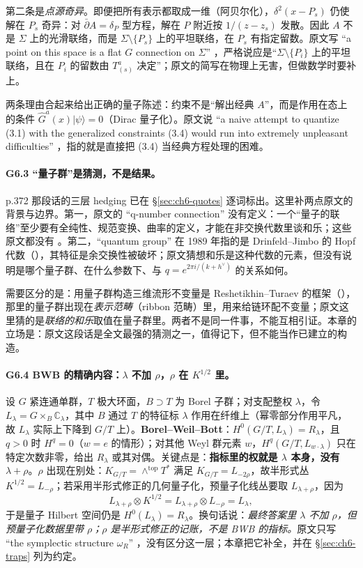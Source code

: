 第二条是\emph{点源奇异}。即便把所有表示都取成一维（阿贝尔化），$\delta^2(x-P_s)$ 仍使解在 $P_s$ 奇异：对 $\bar\partial A=\delta_P$ 型方程，解在 $P$ 附近按 $1/(z-z_s)$ 发散。因此 $A$ 不是 $\Sigma$ 上的光滑联络，而是 $\Sigma\setminus\{P_s\}$ 上的平坦联络，在 $P_s$ 有指定留数。原文写 “a point on this space is a flat $G$ connection on $\Sigma$” ，严格说应是“$\Sigma\setminus\{P_i\}$ 上的平坦联络，且在 $P_i$ 的留数由 $T^a_{(s)}$ 决定”；原文的简写在物理上无害，但做数学时要补上。

两条理由合起来给出正确的量子陈述：约束不是“解出经典 $A$”，而是作用在态上的条件 $\hat G^a(x)|\psi\rangle=0$（Dirac 量子化）。原文说 “a naive attempt to quantize (3.1) with the generalized constraints (3.4) would run into extremely unpleasant difficulties” ，指的就是直接把 (3.4) 当经典方程处理的困难。

\paragraph{G6.3 “量子群”是猜测，不是结果。}p.372 那段话的三层 hedging 已在 \S\ref{sec:ch6-quotes} 逐词标出。这里补两点原文的背景与边界。第一，原文的 “q-number connection” 没有定义：一个“量子的联络”至少要有全纯性、规范变换、曲率的定义，才能在非交换代数里谈和乐；这些原文都没有 。第二，“quantum group” 在 1989 年指的是 Drinfeld--Jimbo 的 Hopf 代数（\cite{drinfeld1986}），其特征是余交换性被破坏；原文猜想和乐是这种代数的元素，但没有说明是哪个量子群、在什么参数下、与 $q=e^{2\pi i/(k+h^\vee)}$ 的关系如何。

需要区分的是：用量子群构造三维流形不变量是 Reshetikhin--Turaev 的框架（\cite{rt1991}），那里的量子群出现在\emph{表示范畴}（ribbon 范畴）里，用来给链环配不变量；原文这里猜的是\emph{联络的和乐}取值在量子群里。两者不是同一件事，不能互相引证。本章的立场是：原文这段话是全文最强的猜测之一，值得记下，但不能当作已建立的构造。

\paragraph{G6.4 BWB 的精确内容：$\lambda$ 不加 $\rho$，$\rho$ 在 $K^{1/2}$ 里。}设 $G$ 紧连通单群，$T$ 极大环面，$B\supset T$ 为 Borel 子群；对支配整权 $\lambda$，令 $L_\lambda=G\times_B\mathbb C_\lambda$，其中 $B$ 通过 $T$ 的特征标 $\lambda$ 作用在纤维上（幂零部分作用平凡，故 $L_\lambda$ 实际上下降到 $G/T$ 上）。\textbf{Borel--Weil--Bott}：$H^0(G/T,L_\lambda)=R_\lambda$，且 $q>0$ 时 $H^q=0$（$w=e$ 的情形）；对其他 Weyl 群元素 $w$，$H^q(G/T,L_{w\cdot\lambda})$ 只在特定次数非零，给出 $R_\lambda$ 或其对偶。关键点是：\textbf{指标里的权就是 $\lambda$ 本身，没有 $\lambda+\rho$}。$\rho$ 出现在别处：$K_{G/T}=\wedge^{\mathrm{top}}T^*$ 满足 $K_{G/T}=L_{-2\rho}$，故半形式丛 $K^{1/2}=L_{-\rho}$；若采用半形式修正的几何量子化，预量子化线丛要取 $L_{\lambda+\rho}$，因为
\[
L_{\lambda+\rho}\otimes K^{1/2}=L_{\lambda+\rho}\otimes L_{-\rho}=L_\lambda ,
\]
于是量子 Hilbert 空间仍是 $H^0(L_\lambda)=R_\lambda$。换句话说：\emph{最终答案里 $\lambda$ 不加 $\rho$，但预量子化数据里带 $\rho$；$\rho$ 是半形式修正的记账，不是 BWB 的指标。}原文只写 “the symplectic structure $\omega_R$” ，没有区分这一层；本章把它补全，并在 \S\ref{sec:ch6-traps} 列为约定。

